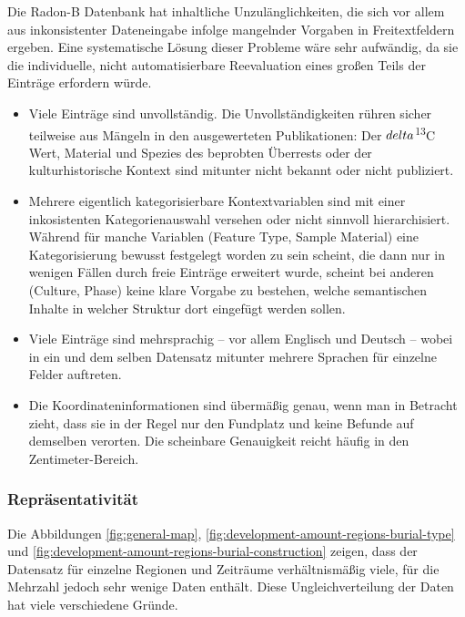 \documentclass[openany,twoside,twocolumn]{book}
\providecommand{\tightlist}{%
  \setlength{\itemsep}{0pt}\setlength{\parskip}{0pt}}
\begin{document}
Die Radon-B Datenbank hat inhaltliche Unzulänglichkeiten, die sich vor
allem aus inkonsistenter Dateneingabe infolge mangelnder Vorgaben in
Freitextfeldern ergeben. Eine systematische Lösung dieser Probleme wäre
sehr aufwändig, da sie die individuelle, nicht automatisierbare
Reevaluation eines großen Teils der Einträge erfordern würde.

\begin{itemize}
\tightlist
\item
  Viele Einträge sind unvollständig. Die Unvollständigkeiten rühren
  sicher teilweise aus Mängeln in den ausgewerteten Publikationen: Der
  \(\\delta\)\textsuperscript{13}C Wert, Material und Spezies des
  beprobten Überrests oder der kulturhistorische Kontext sind mitunter
  nicht bekannt oder nicht publiziert.
\item
  Mehrere eigentlich kategorisierbare Kontextvariablen sind mit einer
  inkosistenten Kategorienauswahl versehen oder nicht sinnvoll
  hierarchisiert. Während für manche Variablen (Feature Type, Sample
  Material) eine Kategorisierung bewusst festgelegt worden zu sein
  scheint, die dann nur in wenigen Fällen durch freie Einträge erweitert
  wurde, scheint bei anderen (Culture, Phase) keine klare Vorgabe zu
  bestehen, welche semantischen Inhalte in welcher Struktur dort
  eingefügt werden sollen.
\item
  Viele Einträge sind mehrsprachig -- vor allem Englisch und Deutsch --
  wobei in ein und dem selben Datensatz mitunter mehrere Sprachen für
  einzelne Felder auftreten.
\item
  Die Koordinateninformationen sind übermäßig genau, wenn man in
  Betracht zieht, dass sie in der Regel nur den Fundplatz und keine
  Befunde auf demselben verorten. Die scheinbare Genauigkeit reicht
  häufig in den Zentimeter-Bereich.
\end{itemize}

\hypertarget{representativity}{%
\subsubsection{Repräsentativität}\label{representativity}}

Die Abbildungen \ref{fig:general-map},
\ref{fig:development-amount-regions-burial-type} und
\ref{fig:development-amount-regions-burial-construction} zeigen, dass
der Datensatz für einzelne Regionen und Zeiträume verhältnismäßig viele,
für die Mehrzahl jedoch sehr wenige Daten enthält. Diese
Ungleichverteilung der Daten hat viele verschiedene Gründe.
\end{document}
